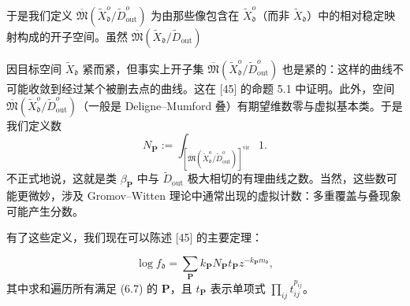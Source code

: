 于是我们定义 $\overline{\mathfrak{M}}(\tilde X_{\mathfrak{d}}^o/\tilde D_{\mathrm{out}}^o)$ 为由那些像包含在 $\tilde X_{\mathfrak{d}}^o$（而非 $\tilde X_{\mathfrak{d}}$）中的相对稳定映射构成的开子空间。虽然 $\overline{\mathfrak{M}}(\tilde X_{\mathfrak{d}}/\tilde D_{\mathrm{out}})$

因目标空间 $\tilde X_{\mathfrak{d}}$ 紧而紧，但事实上开子集 $\overline{\mathfrak{M}}(\tilde X_{\mathfrak{d}}^o/\tilde D_{\mathrm{out}}^o)$ 也是紧的：这样的曲线不可能收敛到经过某个被删去点的曲线。这在 [45] 的命题 5.1 中证明。此外，空间 $\overline{\mathfrak{M}}(\tilde X_{\mathfrak{d}}^o/\tilde D_{\mathrm{out}}^o)$（一般是 Deligne–Mumford 叠）有期望维数零与虚拟基本类。于是我们定义数
\[
N_{\mathbf{P}}:=\int_{[\overline{\mathfrak{M}}(\tilde X_{\mathfrak{d}}^o/\tilde D_{\mathrm{out}}^o)]^{\mathrm{vir}}}1.
\]
不正式地说，这就是类 $\beta_{\mathbf{P}}$ 中与 $\tilde D_{\mathrm{out}}$ 极大相切的有理曲线之数。当然，这些数可能更微妙，涉及 Gromov–Witten 理论中通常出现的虚拟计数：多重覆盖与叠现象可能产生分数。

有了这些定义，我们现在可以陈述 [45] 的主要定理：

\begin{theorem}
\[
\log f_{\mathfrak{d}}=\sum_{\mathbf{P}}k_{\mathbf{P}}N_{\mathbf{P}}t_{\mathbf{P}}z^{-k_{\mathbf{P}}m_{\mathfrak{d}}},
\]
其中求和遍历所有满足 (6.7) 的 $\mathbf{P}$，且 $t_{\mathbf{P}}$ 表示单项式 $\prod_{ij}t_{ij}^{p_{ij}}$。
\end{theorem}


